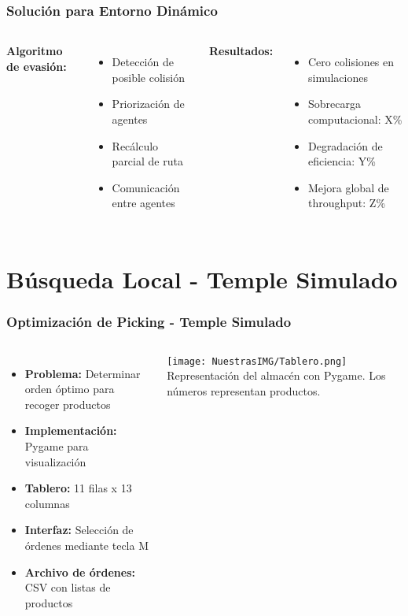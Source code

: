 \documentclass[aspectratio=169]{beamer}
\begin{document}
\begin{frame}
    \frametitle{Solución para Entorno Dinámico}
    \begin{columns}
        \textbf{Algoritmo de evasión:}
        \begin{itemize}
            \item Detección de posible colisión
            \item Priorización de agentes
            \item Recálculo parcial de ruta
            \item Comunicación entre agentes
        \end{itemize}
        
        \textbf{Resultados:}
        \begin{itemize}
            \item Cero colisiones en simulaciones
            \item Sobrecarga computacional: X\%
            \item Degradación de eficiencia: Y\%
            \item Mejora global de throughput: Z\%
        \end{itemize}
    \end{columns}
\end{frame}


\section{Búsqueda Local - Temple Simulado}

\begin{frame}
    \frametitle{Optimización de Picking - Temple Simulado}
    \begin{columns}
        \begin{itemize}
            \item \textbf{Problema:} Determinar orden óptimo para recoger productos
            \item \textbf{Implementación:} Pygame para visualización
            \item \textbf{Tablero:} 11 filas x 13 columnas
            \item \textbf{Interfaz:} Selección de órdenes mediante tecla M
            \item \textbf{Archivo de órdenes:} CSV con listas de productos
        \end{itemize}
        
        \texttt{[image: NuestrasIMG/Tablero.png]}
        \vspace{0.2cm}
        \small{Representación del almacén con Pygame. Los números representan productos.}
    \end{columns}
\end{frame}
\end{document}
